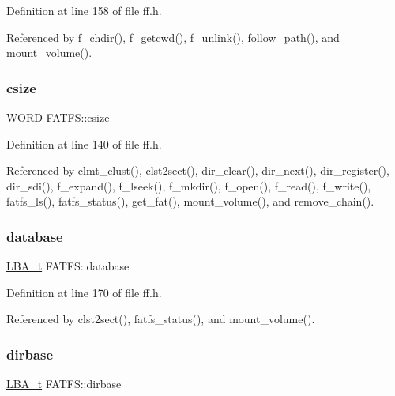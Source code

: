 Definition at line 158 of file ff.\+h.



Referenced by f\+\_\+chdir(), f\+\_\+getcwd(), f\+\_\+unlink(), follow\+\_\+path(), and mount\+\_\+volume().

\mbox{\label{structFATFS_ad7fa7a509f8d097a9ab182d6c47be568}} 
\subsubsection{\texorpdfstring{csize}{csize}}
{\footnotesize\ttfamily \hyperlink{ff_8h_a197942eefa7db30960ae396d68339b97}{W\+O\+RD} F\+A\+T\+F\+S\+::csize}



Definition at line 140 of file ff.\+h.



Referenced by clmt\+\_\+clust(), clst2sect(), dir\+\_\+clear(), dir\+\_\+next(), dir\+\_\+register(), dir\+\_\+sdi(), f\+\_\+expand(), f\+\_\+lseek(), f\+\_\+mkdir(), f\+\_\+open(), f\+\_\+read(), f\+\_\+write(), fatfs\+\_\+ls(), fatfs\+\_\+status(), get\+\_\+fat(), mount\+\_\+volume(), and remove\+\_\+chain().

\mbox{\label{structFATFS_a4ce7c10569f45fae1c709c9ee41f69cb}} 
\subsubsection{\texorpdfstring{database}{database}}
{\footnotesize\ttfamily \hyperlink{ff_8h_a1f3c30a83148a28340f009d4e583f087}{L\+B\+A\+\_\+t} F\+A\+T\+F\+S\+::database}



Definition at line 170 of file ff.\+h.



Referenced by clst2sect(), fatfs\+\_\+status(), and mount\+\_\+volume().

\mbox{\label{structFATFS_afc8c3d5d8408b70379f23382c6e28168}} 
\subsubsection{\texorpdfstring{dirbase}{dirbase}}
{\footnotesize\ttfamily \hyperlink{ff_8h_a1f3c30a83148a28340f009d4e583f087}{L\+B\+A\+\_\+t} F\+A\+T\+F\+S\+::dirbase}



